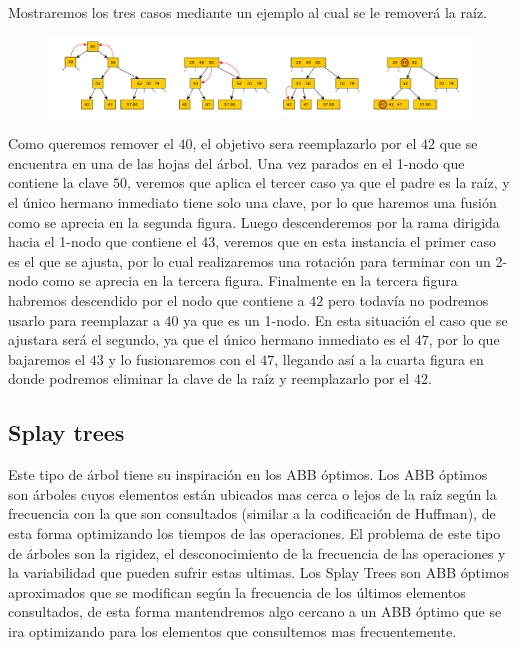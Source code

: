 Mostraremos los tres casos mediante un ejemplo al cual se le remover\'a la ra\'iz.

\begin{figure}
 \centering
 \includegraphics[width=1\textwidth]{graficos/EliminacionArboles234.pdf}
\end{figure}

Como queremos remover el $40$, el objetivo sera reemplazarlo por el $42$ que se encuentra en una de las hojas del \'arbol. Una vez parados en el 1-nodo que contiene la clave $50$, veremos que aplica el tercer caso ya que el padre es la ra\'iz, y el \'unico hermano inmediato tiene solo una clave, por lo que haremos una fusi\'on como se aprecia en la segunda figura. Luego descenderemos por la rama dirigida hacia el 1-nodo que contiene el $43$, veremos que en esta instancia el primer caso es el que se ajusta, por lo cual realizaremos una rotaci\'on para terminar con un 2-nodo como se aprecia en la tercera figura. Finalmente en la tercera figura habremos descendido por el nodo que contiene a $42$ pero todav\'ia no podremos usarlo para reemplazar a $40$ ya que es un 1-nodo. En esta situaci\'on el caso que se ajustara ser\'a el segundo, ya que el \'unico hermano inmediato es el $47$, por lo que bajaremos el $43$ y lo fusionaremos con el $47$, llegando as\'i a la cuarta figura en donde podremos eliminar la clave de 
la ra\'iz y 
reemplazarlo por el $42$.

\subsection{Splay trees}

Este tipo de \'arbol tiene su inspiraci\'on en los ABB \'optimos. Los ABB \'optimos son \'arboles cuyos elementos est\'an ubicados mas cerca o lejos de la ra\'iz seg\'un la frecuencia con la que son consultados (similar a la codificaci\'on de Huffman), de esta forma optimizando los tiempos de las operaciones. El problema de este tipo de \'arboles son la rigidez, el desconocimiento de la frecuencia de las operaciones y la variabilidad que pueden sufrir estas ultimas. Los Splay Trees son ABB \'optimos aproximados que se modifican seg\'un la frecuencia de los \'ultimos elementos consultados, de esta forma mantendremos algo cercano a un ABB \'optimo que se ira optimizando para los elementos que consultemos mas frecuentemente.

